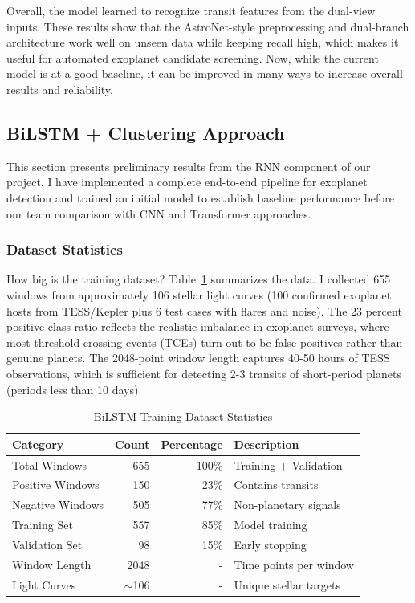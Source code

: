 \documentclass[letterpaper]{article} %
\begin{document}
Overall, the model learned to recognize transit features from the dual-view inputs. These results show that the AstroNet-style preprocessing and dual-branch architecture work well on unseen data while keeping recall high, which makes it useful for automated exoplanet candidate screening. Now, while the current model is at a good baseline, it can be improved in many ways to increase overall results and reliability.

\subsection{BiLSTM + Clustering Approach}
This section presents preliminary results from the RNN component of our project. I have implemented a complete end-to-end pipeline for exoplanet detection and trained an initial model to establish baseline performance before our team comparison with CNN and Transformer approaches.

\subsubsection{Dataset Statistics}
How big is the training dataset? Table~\ref{tab:bilstm_dataset} summarizes the data. I collected 655 windows from approximately 106 stellar light curves (100 confirmed exoplanet hosts from TESS/Kepler plus 6 test cases with flares and noise). The 23 percent positive class ratio reflects the realistic imbalance in exoplanet surveys, where most threshold crossing events (TCEs) turn out to be false positives rather than genuine planets. The 2048-point window length captures 40-50 hours of TESS observations, which is sufficient for detecting 2-3 transits of short-period planets (periods less than 10 days).

\begin{table}[h]
\centering
\caption{BiLSTM Training Dataset Statistics}
\label{tab:bilstm_dataset}
\begin{tabular}{@{}lrrp{2cm}@{}}
\toprule
\textbf{Category} & \textbf{Count} & \textbf{Percentage} & \textbf{Description} \\
\midrule
Total Windows & 655 & 100\% & Training + Validation \\
Positive Windows & 150 & 23\% & Contains transits \\
Negative Windows & 505 & 77\% & Non-planetary signals \\
Training Set & 557 & 85\% & Model training \\
Validation Set & 98 & 15\% & Early stopping \\
Window Length & 2048 & - & Time points per window \\
Light Curves & $\sim$106 & - & Unique stellar targets \\
\bottomrule
\end{tabular}
\end{table}
\end{document}
